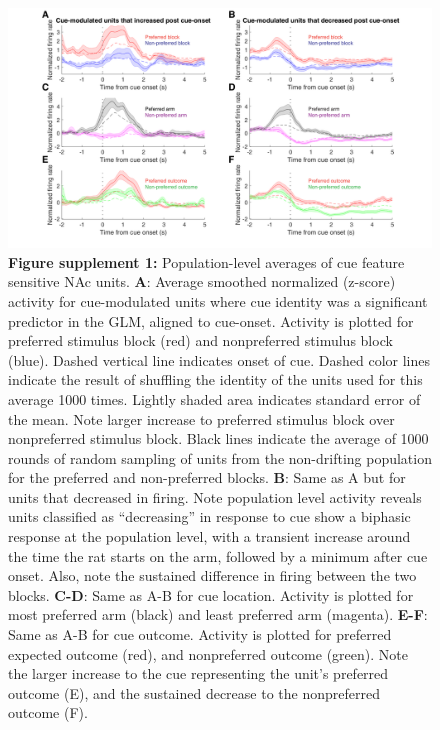 \documentclass[11pt]{article}
\newcommand{\bsf}[1]{\textbf{#1}}
\providecommand{\DIFaddendFL}{} %
\DeclareRobustCommand{\DIFaddendFL}{\DIFOaddendFL \let\includegraphics\DIFOincludegraphics} %
\begin{document}
 \begin{figure}[ht!]
\centering
\includegraphics[width=\textwidth]{Fig 6 - SUPP Population averages.pdf}
\caption*{\bsf{Figure supplement 1:} Population-level averages of cue feature sensitive NAc units. \bsf{A}:
  Average smoothed normalized (z-score) activity for cue-modulated units where
  cue identity was a significant predictor in the GLM, aligned to
  cue-onset. Activity is plotted for preferred stimulus block (red) and
  nonpreferred stimulus block (blue). Dashed vertical line indicates onset of
  cue. Dashed color lines indicate the result of shuffling the identity of the units used for this average 1000 times. Lightly shaded area indicates standard error of the mean. Note larger
  increase to preferred stimulus block over nonpreferred stimulus block. Black
  lines indicate the average of 1000 rounds of random sampling of units from the
  non-drifting population for the preferred and non-preferred blocks. \bsf{B}:
  Same as A but for units that decreased in firing. Note population level
  activity reveals units classified as “decreasing” in response to cue show a
  biphasic response at the population level, with a transient increase around
  the time the rat starts on the arm, followed by a minimum after cue
  onset. Also, note the sustained difference in firing between the two
  blocks. \bsf{C-D}: Same as A-B for cue location. Activity is plotted for
  most preferred arm (black) and least preferred arm (magenta). \bsf{E-F}: Same as A-B for cue outcome. Activity is
  plotted for preferred expected outcome (red), and nonpreferred outcome
  (green). Note the larger increase to the cue representing the unit’s preferred
  outcome (E), and the sustained decrease to the nonpreferred outcome (F).}
\DIFaddendFL \label{fig:pop}
\end{figure} \clearpage
\end{document}

